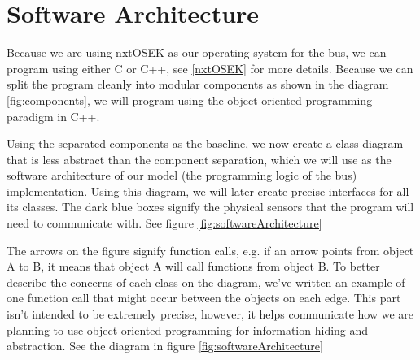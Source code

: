 \section{Software Architecture}

Because we are using nxtOSEK as our operating system for the bus, we can program using either C or C++, see \ref{nxtOSEK} for more details. Because we can split the program cleanly into modular components as shown in the diagram \ref{fig:components}, we will program using the object-oriented programming paradigm in C++. 

Using the separated components as the baseline, we now create a class diagram that is less abstract than the component separation, which we will use as the software architecture of our model (the programming logic of the bus) implementation. Using this diagram, we will later create precise interfaces for all its classes. The dark blue boxes signify the physical sensors that the program will need to communicate with. See figure \ref{fig:softwareArchitecture} 

The arrows on the figure signify function calls, e.g. if an arrow points from object A to B, it means that object A will call functions from object B. To better describe the concerns of each class on the diagram, we've written an example of one function call that might occur between the objects on each edge. This part isn't intended to be extremely precise, however, it helps communicate how we are planning to use object-oriented programming for information hiding and abstraction. See the diagram in figure \ref{fig:softwareArchitecture}

